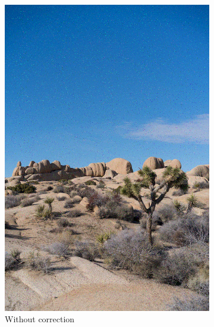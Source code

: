 \documentclass{article}
\begin{document}
\begin{figure}
\begin{subfigure}[b]{0.32\textwidth}
        \includegraphics[width=\textwidth]{../Result/linear-bsc-output.png}
        \caption{Without correction}
        \label{fig:image-linear-bsc-no-correction}
    \end{subfigure}
    \hfill
    \begin{subfigure}[b]{0.32\textwidth}
        \centering

\end{subfigure}
\end{figure}
\end{document}
